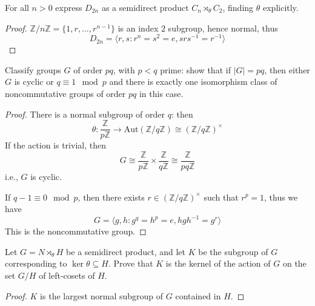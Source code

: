 \documentclass[openany]{book}
\newcommand{\Z}{\mathbb{Z}}
\newcommand{\la}{\langle}
\newcommand{\ra}{\rangle}
\newcommand{\aut}{\text{Aut}}
\begin{document}
    \begin{prob}[5.11]
    For all $n > 0$ express $D_{2n}$ as a semidirect product $C_n \rtimes_\theta C_2$, finding $\theta$ explicitly. 
    \end{prob}
\begin{proof}
    $\Z/n\Z=\{1,r,\dots, r^{n-1}\}$ is an index $2$ subgroup, hence normal, thus 
    \begin{equation*}
        D_{2n}=\la r,s: r^n=s^2=e, srs^{-1}=r^{-1}\ra
    \end{equation*}
\end{proof}
    
    \begin{prob}[5.12]
    Classify groups $G$ of order $pq$, with $p < q$ prime: show that if $|G| = pq$, then either $G$ is cyclic or $q \equiv 1 \mod p$ and there is exactly one isomorphism class of noncommutative groups of order $pq$ in this case. 
    \end{prob}
\begin{proof}
    There is a normal subgroup of order $q$: then 
    \begin{equation*}
        \theta: \frac{\Z}{p\Z}\to\aut\left(\Z/q\Z\right)\cong(\Z/q\Z)^\times
    \end{equation*}
    If the action is trivial, then
    \begin{equation*}
        G\cong\frac{\Z}{p\Z}\times\frac{\Z}{q\Z}\cong\frac{\Z}{pq\Z}
    \end{equation*}
    i.e., $G$ is cyclic.

    If $q-1\equiv 0\mod p$, then there exists $r\in(\Z/q\Z)^\times$ such that $r^p=1$, thus we have 
    \begin{equation*}
        G=\la g,h: g^q=h^p=e, hgh^{-1}=g^r\ra
    \end{equation*}
    This is the noncommutative group.
\end{proof}
    
    \begin{prob}[5.13]
    Let $G = N \rtimes_\theta H$ be a semidirect product, and let $K$ be the subgroup of $G$ corresponding to $\ker \theta \subseteq H$. Prove that $K$ is the kernel of the action of $G$ on the set $G/H$ of left-cosets of $H$. 
    \end{prob}
\begin{proof}
    $K$ is the largest normal subgroup of $G$ contained in $H$.
\end{proof}
  
\end{document}
